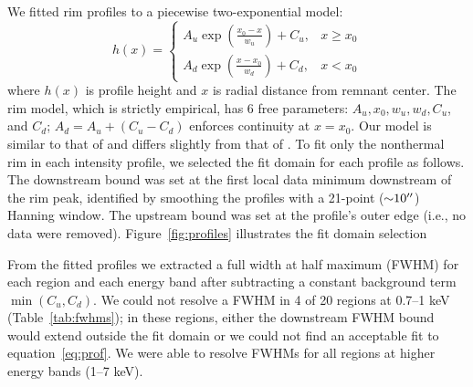 \documentclass[iop, apj, numberedappendix]{emulateapj}
\newcommand*{\abt}{\mathord{\sim}} %
\begin{document}
We fitted rim profiles to a piecewise two-exponential model:
\begin{equation} \label{eq:prof}
    h(x) =
    \begin{cases}
        A_u \exp \left(\frac{x_0 - x}{w_u}\right) + C_u, &x \geq x_0 \\
        A_d \exp \left(\frac{x - x_0}{w_d}\right) + C_d, &x < x_0
    \end{cases}
\end{equation}
where $h(x)$ is profile height and $x$ is radial distance from remnant center.
The rim model, which is strictly empirical, has 6 free parameters:
$A_u, x_0, w_u, w_d, C_u$, and $C_d$; $A_d = A_u + (C_u - C_d)$ enforces
continuity at $x=x_0$. Our model is similar to that of \citet{bamba2003,
bamba2005-hist} and differs slightly from that of .
To fit only the nonthermal rim in each intensity profile, we selected the fit
domain for each profile as follows.  The downstream bound was set at the first
local data minimum downstream of the rim peak, identified by smoothing the
profiles with a 21-point ($\abt 10\arcsec$) Hanning window.  The upstream bound
was set at the profile's outer edge (i.e., no data were removed).
Figure~\ref{fig:profiles} illustrates the fit domain selection

\begin{figure*}%
    \iftoggle{manuscript}{
        \epsscale{1}
    }{}
    \caption{Best fit profiles with measured FWHMs demarcated for each energy
        band in Region 1 (top) and Region 16 (bottom).  Energy bands increase
        from left to right.  Data points in red were excluded from profile
        fitting domains as described in text.}
    \label{fig:profiles}
\end{figure*}

From the fitted profiles we extracted a full width at half maximum (FWHM) for
each region and each energy band after subtracting a constant background term
$\min(C_u, C_d)$.  We could not resolve a FWHM in 4 of 20 regions at 0.7--1 keV
(Table~\ref{tab:fwhms}); in these regions, either the downstream FWHM bound
would extend outside the fit domain or we could not find an acceptable fit to
equation~\eqref{eq:prof}.  We were able to resolve FWHMs for all regions at
higher energy bands (1--7 keV).
\end{document}
